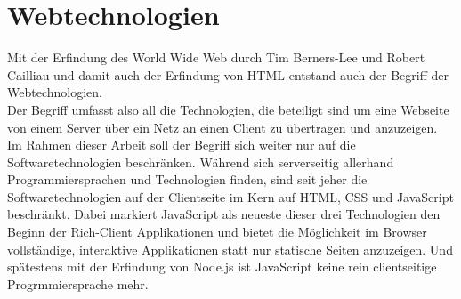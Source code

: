 \section{Webtechnologien}
\label{section:webtechnologien}

Mit der Erfindung des World Wide Web durch Tim Berners-Lee und Robert Cailliau und damit auch der Erfindung 
von HTML \cite{www} entstand auch der Begriff der Webtechnologien.\\
Der Begriff umfasst also all die Technologien, die beteiligt sind um eine Webseite von einem Server über ein 
Netz an einen Client zu übertragen und anzuzeigen.\\

Im Rahmen dieser Arbeit soll der Begriff sich weiter nur auf die Softwaretechnologien beschränken. Während 
sich serverseitig allerhand Programmiersprachen und Technologien finden, sind seit jeher die Softwaretechnologien
auf der Clientseite im Kern auf HTML, CSS und JavaScript beschränkt. Dabei markiert JavaScript als neueste dieser
drei Technologien \cite{jspress} den Beginn der Rich-Client Applikationen und bietet die Möglichkeit im Browser 
vollständige, interaktive Applikationen statt nur statische Seiten anzuzeigen. Und spätestens mit der Erfindung 
von Node.js ist JavaScript keine rein clientseitige Progrmmiersprache mehr. 


% 